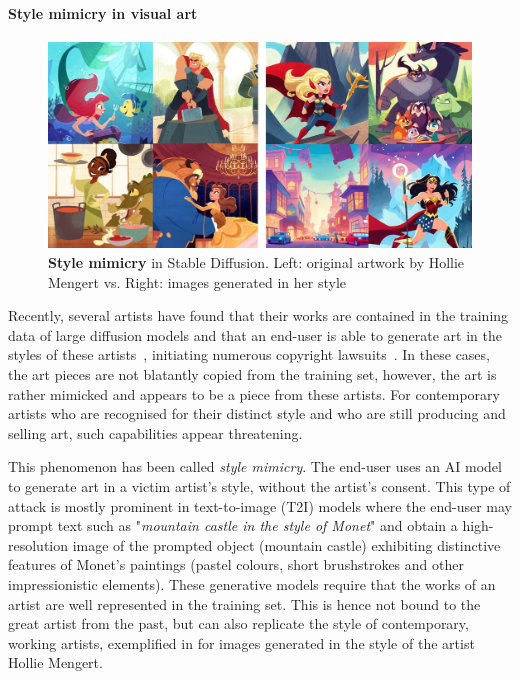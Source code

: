 \documentclass[conference,table]{IEEEtran} %
\begin{document}
\paragraph{Style mimicry in visual art}
\begin{figure}[ht]
    \centering
    \includegraphics[width=\linewidth]{figures/mimicry.jpg}
    \caption{\textbf{Style mimicry} in Stable Diffusion. Left: original artwork by Hollie Mengert vs. Right: images generated in her style~\cite{baio_invasive_2022}}
    \label{fig:style-mimicry}
\end{figure}
Recently, several artists have found that their works are contained in the training data of large diffusion models and that an end-user is able to generate art in the styles of these artists~\cite{mit_technology_review_this_2022}, initiating numerous copyright lawsuits~\cite{nolan_ai_2023}.
In these cases, the art pieces are not blatantly copied from the training set, however, the art is rather mimicked and appears to be a piece from these artists.
For contemporary artists who are recognised for their distinct style and who are still producing and selling art, such capabilities appear threatening.  

This phenomenon has been called \textit{style mimicry}. The end-user uses an AI model to generate art in a victim artist's style, without the artist's consent. 
This type of attack is mostly prominent in text-to-image (T2I) models where the end-user may prompt text such as "\textit{mountain castle in the style of Monet}" and obtain a high-resolution image of the prompted object (mountain castle) exhibiting distinctive features of Monet's paintings (pastel colours, short brushstrokes and other impressionistic elements). 
These generative models require that the works of an artist are well represented in the training set. This is hence not bound to the great artist from the past, but can also replicate the style of contemporary, working artists, exemplified in  for images generated in the style of the artist Hollie Mengert.
 
\end{document}
